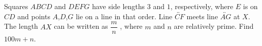 Squares $ABCD$ and $DEFG$ have side lengths $3$ and $1$, respectively, where $E$ is on $CD$ and points $A$,$D$,$G$ lie on a line in that order. Line $\overleftrightarrow{CF}$ meets line $\overleftrightarrow{AG}$ at $X$. The length $AX$ can be written as $\dfrac{m}{n}$ , where $m$ and $n$ are relatively prime. Find $100m + n$.
